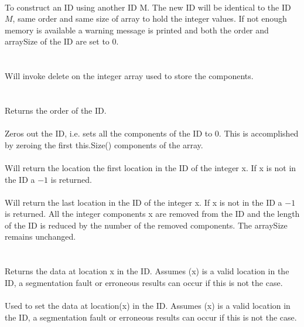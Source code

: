  \\
To construct an ID using another ID \p M. The new ID will be
identical to the ID $M$, same order and same size of array to hold the
integer values. If not enough memory is available a
warning message is printed and both the order and arraySize of the ID
are set to $0$. \\

 \\
\\ 
Will invoke delete on the integer array used to store the components. \\

  \\
 \\
Returns the order of the ID. \\

 \\
Zeros out the ID, i.e. sets all the components of the ID to
$0$. This is accomplished by zeroing the first this.Size()
components of the array. \\

 \\
Will return the location the first location in the ID of the integer
\p x. If \p x is not in the ID a $-1$ is returned. \\

 \\
Will return the last location in the ID of the integer
\p x. If \p x is not in the ID a $-1$ is returned. All the integer
components \p x are removed from the ID and the length of the ID is
reduced by the number of the removed components. The \p arraySize
remains unchanged. \\ 


  \\
 \\
Returns the data at location \p x in the ID. Assumes (\p x)
is a valid location in the ID, a segmentation fault or erroneous
results can occur if this is not the case. \\

 \\
Used to set the data at location(\p x) in the ID. Assumes (\p x)
is a valid location in the ID, a segmentation fault or erroneous
results can occur if this is not the case. \\

